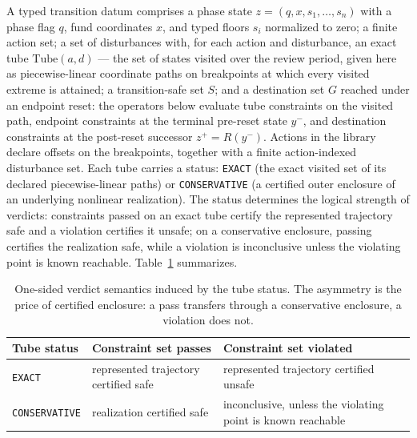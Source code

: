 \documentclass[3p,11pt]{elsarticle}
\begin{document}
A typed transition datum comprises a phase state
$z = (q, x, s_1, \dots, s_n)$ with a phase flag $q$, fund coordinates $x$,
and typed floors $s_i$ normalized to zero; a finite action set; a set of disturbances with, for each action and
disturbance, an exact tube $\mathrm{Tube}(a, d)$ --- the set of states
visited over the review period, given here as piecewise-linear coordinate
paths on breakpoints at which every visited extreme is attained; a
transition-safe set $S$; and a destination set $G$ reached under an
endpoint reset: the operators below evaluate tube constraints on the
visited path, endpoint constraints at the terminal pre-reset state
$y^{-}$, and destination constraints at the post-reset successor
$z^{+} = R(y^{-})$. Actions in the library declare offsets on the
breakpoints, together with a finite action-indexed disturbance set. Each
tube carries a status: \texttt{EXACT} (the exact visited set of its
declared piecewise-linear paths) or \texttt{CONSERVATIVE} (a certified
outer enclosure of an underlying nonlinear realization). The status
determines the logical strength of verdicts: constraints passed on an
exact tube certify the represented trajectory safe and a violation
certifies it unsafe; on a conservative enclosure, passing certifies the
realization safe, while a violation is inconclusive unless the violating
point is known reachable. Table~\ref{tab:verdicts} summarizes.

\begin{table}[t]
\centering\small
\begin{tabular}{@{}lll@{}}
\toprule
Tube status & Constraint set passes & Constraint set violated \\
\midrule
\texttt{EXACT} & represented trajectory certified safe & represented
trajectory certified unsafe \\
\texttt{CONSERVATIVE} & realization certified safe & inconclusive,
unless the violating point is known reachable \\
\bottomrule
\end{tabular}
\caption{One-sided verdict semantics induced by the tube status. The
asymmetry is the price of certified enclosure: a pass transfers through
a conservative enclosure, a violation does not.}
\label{tab:verdicts}
\end{table}
\end{document}

